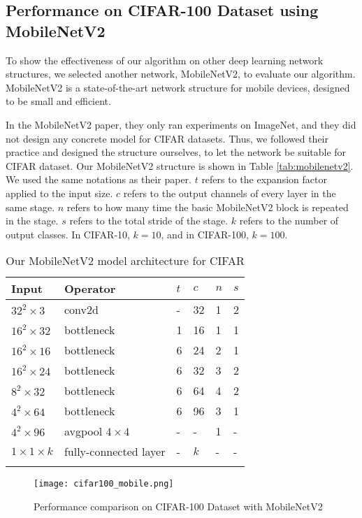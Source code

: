 \subsection{Performance on CIFAR-100 Dataset using MobileNetV2}

To show the effectiveness of our algorithm on other deep learning network structures, we selected another network, MobileNetV2\cite{sandler2018inverted}, to evaluate our algorithm. MobileNetV2 is a state-of-the-art network structure for mobile devices, designed to be small and efficient.

In the MobileNetV2 paper, they only ran experiments on ImageNet, and they did not design any concrete model for CIFAR datasets. Thus, we followed their practice and designed the structure ourselves, to let the network be suitable for CIFAR dataset. Our MobileNetV2 structure is shown in Table \ref{tab:mobilenetv2}. We used the same notations as their paper. $t$ refers to the expansion factor applied to the input size. $c$ refers to the output channels of every layer in the same stage. $n$ refers to how many time the basic MobileNetV2 block is repeated in the stage. $s$ refers to the total stride of the stage. $k$ refers to the number of output classes. In CIFAR-10, $k=10$, and in CIFAR-100, $k=100$.
\begin{table}[!hpb]
	\centering
	\caption[Our MobileNetV2 model architecture for CIFAR]
	{Our MobileNetV2 model architecture for CIFAR}
	\label{tab:mobilenetv2}
	\begin{tabular}{@{}llllll@{}} \toprule
		Input & Operator & $t$ & $c$ & $n$ & $s$\\ \midrule
		$32^2\times3$ & conv2d & - &32&1&2\\ 
		$16^2\times32$ & bottleneck & 1 &16&1&1\\ 
		$16^2\times16$ & bottleneck & 6 &24&2&1\\ 
		$16^2\times24$ & bottleneck & 6 &32&3&2\\ 
		$8^2\times32$ & bottleneck & 6 &64&4&2\\ 		
		$4^2\times64$ & bottleneck & 6 &96&3&1\\ 
		$4^2\times96$ & avgpool $4\times4$ & - &-&1&-\\ 	
		$1\times1\times k$ & fully-connected layer & - &$k$&-&-\\ 				
		\bottomrule
		\label{tab:cifar100_mobile}
	\end{tabular}
\end{table}
\begin{figure}[!htp]
	\centering
	\texttt{[image: cifar100\_mobile.png]}
	\caption[Performance comparison on CIFAR-100 Dataset with MobileNetV2]
	{Performance comparison on CIFAR-100 Dataset with MobileNetV2}
	\label{fig:cifar100_mobile}
\end{figure}


